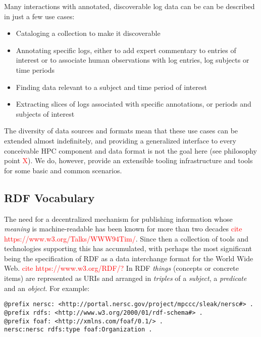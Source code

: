 \begin{enumerate}
      Many interactions with annotated, discoverable log data can be 
      can be described in just a few use cases:
      
\begin{itemize}
\item Cataloging a collection to make it discoverable
\item Annotating specific logs, either to add expert commentary to 
      entries of interest or to associate human observations with log 
      entries, log subjects or time periods
\item Finding data relevant to a subject and time period of interest
\item Extracting slices of logs associated with specific annotations, 
      or periods and subjects of interest
\end{itemize}

     The diversity of data sources and formats mean that these use cases 
     can be extended almost indefinitely, and providing a generalized 
     interface to every conceivable HPC component and data format is 
     not the goal here (see philosophy point \textcolor{red}{X}). We 
     do, however, provide an extensible tooling infrastructure and tools
     for some basic and common scenarios.

\end{enumerate}

\subsection{RDF Vocabulary}

The need for a decentralized mechanism for publishing information whose 
\emph{meaning} is machine-readable has been known for more than two decades
\textcolor{red}{cite https://www.w3.org/Talks/WWW94Tim/}. Since then a 
collection of tools and technologies supporting this has accumulated, with
perhaps the most significant being the specification of RDF as a data 
interchange format for the World Wide Web. \textcolor{red}{cite https://www.w3.org/RDF/?}
In RDF \emph{things} (concepts or concrete items) are represented as URIs
and arranged in \emph{triples} of a \emph{subject}, a \emph{predicate} and 
an \emph{object}. For example:

\begin{verbatim}
@prefix nersc: <http://portal.nersc.gov/project/mpccc/sleak/nersc#> .
@prefix rdfs: <http://www.w3.org/2000/01/rdf-schema#> .
@prefix foaf: <http://xmlns.com/foaf/0.1/> .
nersc:nersc rdfs:type foaf:Organization .
\end{verbatim}

